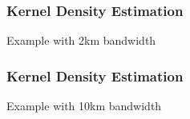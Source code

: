 \documentclass[10pt]{beamer}\usepackage[]{graphicx}\usepackage[]{color}
\newcommand{\bfigure}{\begin{figure}}
\newcommand{\efigure}{\end{figure}}
\newcommand{\bblock}{\begin{block}}
\newcommand{\eblock}{\end{block}}
\begin{document}
\begin{frame}
\frametitle{Kernel Density Estimation}

\bblock{Example with 2km bandwidth}
\bfigure
{}
\efigure
\eblock

\end{frame}


\begin{frame}
\frametitle{Kernel Density Estimation}

\bblock{Example with 10km bandwidth}
\bfigure
{}
\efigure
\eblock

\end{frame}
\end{document}
